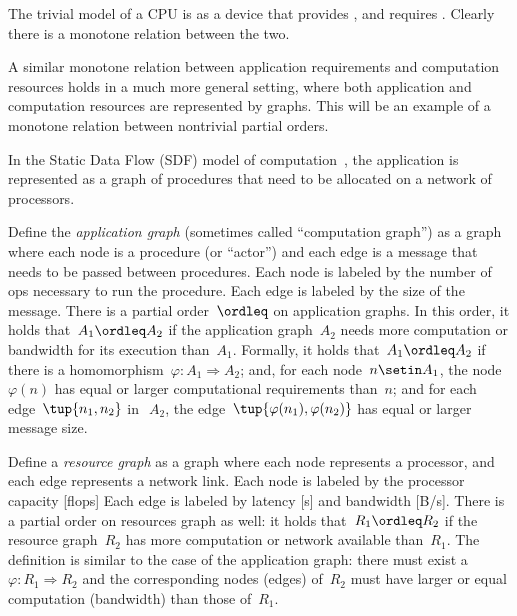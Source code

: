 The trivial model of a CPU is as a device that provides , and requires .
Clearly there is a monotone relation between the two.

\begin{figure}[h]
    \centering
    \caption{}
\end{figure}

A similar monotone relation between application requirements and computation resources holds in a much more general setting, where both application and computation resources are represented by graphs.
This will be an example of a monotone relation between nontrivial partial orders.

In the Static Data Flow (SDF) model of computation~\cite[Chapter 3]{sriram00,lee10}, the application is represented as a graph of procedures that need to be allocated on a network of processors.

\begin{figure*}[h]
    \centering
    \caption{}
\end{figure*}

Define the\emph{ application graph }(sometimes called ``computation graph'') as a graph where each node is a procedure (or ``actor'') and each edge is a message that needs to be passed between procedures.
Each node is labeled by the number of ops necessary to run the procedure.
Each edge is labeled by the size of the message.
There is a partial order~$\ordleq$ on application graphs.
In this order, it holds that~$A_1 \ordleq A_2$ if the application graph~$A_2$ needs more computation or bandwidth for its execution than~$A_1$.
Formally, it holds that~$A_1 \ordleq A_2$
if there is a homomorphism~$\varphi \colon A_1  \Rightarrow A_2$; and, for each node~$n \setin A_1$, the node~$\varphi(n)$ has equal or larger computational requirements than~$n$; and for each edge~$\tup{n_1,n_2}$
in~$~A_2$, the edge~$\tup{\varphi (n_1), \varphi (n_2)}$ has equal or larger message size.

Define a \emph{resource graph} as a graph where each node represents a processor, and each edge represents a network link.
Each node is labeled by the processor capacity [flops] Each edge is labeled by latency [s] and bandwidth [B/s].
There is a partial order on resources graph as well: it holds that~$R_1 \ordleq R_2$ if the resource graph~$R_2$ has more computation or network available than~$R_1$.
The definition is similar to the case of the application graph: there must exist a ~$\varphi \colon R_1  \Rightarrow R_2$
and the corresponding nodes (edges) of~$R_2$ must have larger or equal computation (bandwidth) than those of~$R_1$.

